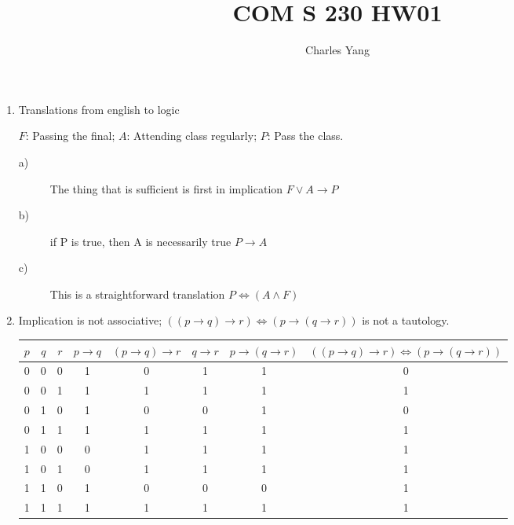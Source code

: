 \documentclass[12pt]{article}
\title{COM S 230 HW01}
\author{Charles Yang}
\begin{document}
    \maketitle

    \begin{enumerate}
        \item Translations from english to logic
        \begin{center}$F$: Passing the final; $A$: Attending class regularly; $P$: Pass the class.\end{center}
            \begin{description}
                \item[a)] The thing that is sufficient is first in implication \boldmath $ F \lor A \to P $
                \item[b)] if P is true, then A is necessarily true \boldmath $ P \to A $
                \item[c)] This is a straightforward translation \boldmath $ P \iff (A \land F) $
            \end{description}
        \item Implication is not associative; $((p \to q) \to r) \iff (p \to (q \to r))$ is not a tautology.
            \begin{table}[h] \begin{center} \centering
                  \begin{tabular}{ |c|c|c|c|c|c|c|c|}
                       $p$ & $q$ & $r$ & $p \to q$ & $(p \to q) \to r$ & $q \to r$ & $p \to (q \to r)$ & $((p \to q) \to r) \iff (p \to (q \to r))$ \\ \hline
                       0 & 0 & 0 & 1 & 0 & 1 & 1 & 0 \\
                       0 & 0 & 1 & 1 & 1 & 1 & 1 & 1 \\
                       0 & 1 & 0 & 1 & 0 & 0 & 1 & 0 \\
                       0 & 1 & 1 & 1 & 1 & 1 & 1 & 1 \\
                       1 & 0 & 0 & 0 & 1 & 1 & 1 & 1 \\
                       1 & 0 & 1 & 0 & 1 & 1 & 1 & 1 \\
                       1 & 1 & 0 & 1 & 0 & 0 & 0 & 1 \\
                       1 & 1 & 1 & 1 & 1 & 1 & 1 & 1
                  \end{tabular} \end{center}
            \end{table}

\end{enumerate}
\end{document}
